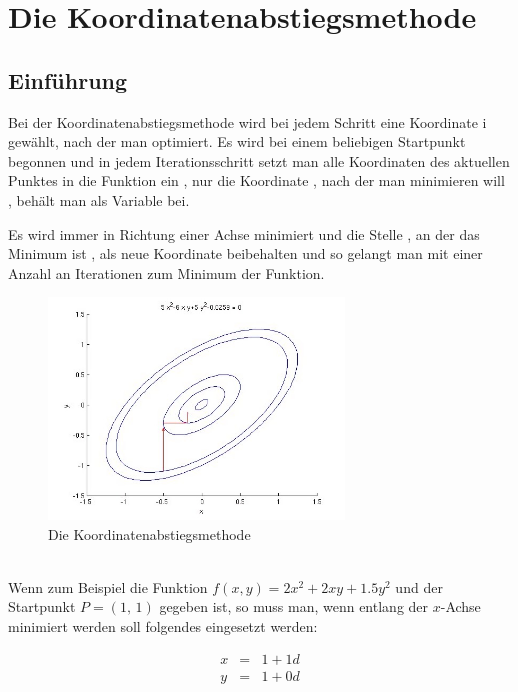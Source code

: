 \documentclass[naustrian]{article}
\begin{document}
{\begin{enumerate}
\end{enumerate}


\section{Die Koordinatenabstiegsmethode}

\subsection{Einführung}

Bei der Koordinatenabstiegsmethode wird bei jedem Schritt eine Koordinate
i gewählt, nach der man optimiert. Es wird bei einem beliebigen Startpunkt
begonnen und in jedem Iterationsschritt setzt man alle Koordinaten
des aktuellen Punktes in die Funktion ein , nur die Koordinate , nach
der man minimieren will , behält man als Variable bei.

Es wird immer in Richtung einer Achse minimiert und die Stelle , an
der das Minimum ist , als neue Koordinate beibehalten und so gelangt
man mit einer Anzahl an Iterationen zum Minimum der Funktion.

\begin{figure}[H]
    \centering
    \includegraphics[width=0.7\textwidth]{coord_desc/Coordinate_descent}
    \caption{Die Koordinatenabstiegsmethode}
\end{figure}

~\\
Wenn zum Beispiel die Funktion $f(x,y)=2x^{2}+2xy+1.5y^{2}$ und der
Startpunkt $P=(1,\,1)$ gegeben ist, so muss man, wenn entlang der
$x$-Achse minimiert werden soll folgendes eingesetzt werden:

\begin{eqnarray*}
    x & = & 1+1d\\
    y & = & 1+0d
\end{eqnarray*}


}
\end{document}
